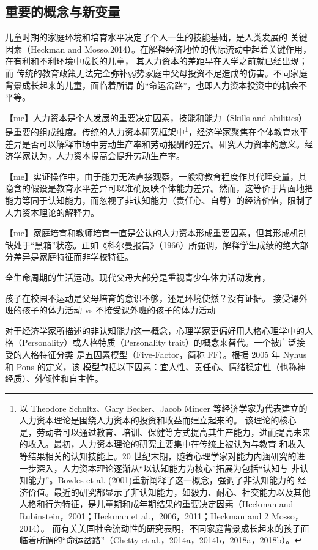 \subsection{重要的概念与新变量}

儿童时期的家庭环境和培育水平决定了个人一生的技能基础，是人类发展的 关键因素（Heckman and Mosso,2014）。在解释经济地位的代际流动中起着关键作用，在有利和不利环境中成长的儿童， 其人力资本的差距早在入学之前就已经出现；而 传统的教育政策无法完全弥补弱势家庭中父母投资不足造成的伤害。不同家庭背景成长起来的儿童，面临着所谓 的“命运岔路”，也即人力资本投资中的机会不平等。

【me】人力资本是个人发展的重要决定因素，技能和能力（Skills and abilities）是重要的组成维度。传统的人力资本研究框架中\footnote{以 Theodore Schultz、Gary Becker、Jacob Mincer 等经济学家为代表建立的人力资本理论是围绕人力资本的投资和收益而建立起来的。 该理论的核心是，劳动者可以通过教育、培训、保健等方式提高其生产能力，进而提高未来的收入。最初，人力资本理论的研究主要集中在传统上被认为与教育 和收入等结果相关的认知技能上。20 世纪末期，随着心理学家对能力内涵研究的进一步深入，人力资本理论逐渐从“以认知能力为核心”拓展为包括“认知与 非认知能力”。Bowles et al. (2001)重新阐释了这一概念，强调了非认知能力的 经济价值。最近的研究都显示了非认知能力，如毅力、耐心、社交能力以及其他人格和行为特征，是儿童期和成年期结果的重要决定因素（Heckman and Rubinstein，2001；Heckman et al.，2006，2011；Heckman and 2 Mosso，2014）。 而有关美国社会流动性的研究表明，不同家庭背景成长起来的孩子面临着所谓的“命运岔路”（Chetty et al.，2014a，2014b，2018a，2018b）。}，经济学家聚焦在个体教育水平差异是否可以解释市场中劳动生产率和劳动报酬的差异。研究人力资本的意义。经济学家认为，人力资本提高会提升劳动生产率。




【me】实证操作中，由于能力无法直接观察，一般将教育程度作其代理变量，其隐含的假设是教育水平差异可以准确反映个体能力差异。然而，这等价于片面地把能力等同于认知能力，而忽视了非认知能力（责任心、自尊）的经济价值，限制了人力资本理论的解释力。

【me】家庭培育和教师培育一直是公认的人力资本形成重要因素，但其形成机制缺处于“黑箱”状态。正如《科尔曼报告》（1966）所强调，解释学生成绩的绝大部分差异是家庭特征而非学校特征。

全生命周期的生活运动。现代父母大部分是重视青少年体力活动发育，

孩子在校园不运动是父母培育的意识不够，还是环境使然？没有证据。
    接受课外班的孩子的体力活动 vs 不接受课外班的孩子的体力活动

对于经济学家所描述的非认知能力这一概念，心理学家更偏好用人格心理学中的人格（Personality）或人格特质（Personality trait）的概念来替代。一个被广泛接受的人格特征分类 是五因素模型（Five-Factor，简称 FF）。根据 2005 年 Nyhus 和 Pons 的定义，该 模型包括以下因素：宜人性、责任心、情绪稳定性（也称神经质）、外倾性和自主性。

